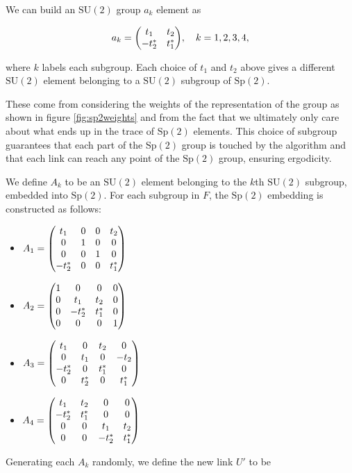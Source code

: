 \documentclass[reqno,12pt]{article}
\numberwithin{equation}{section}
\newcommand{\SU}{\mathrm{SU}}
\newcommand{\Sp}{\mathrm{Sp}}
\begin{document}
We can build an $\SU(2)$ group $a_k$ element as

\begin{equation} \label{eq:su2element}
	a_k = \mqty(t_1 & t_2 \\ -t_2^* & t_1^*) \qc k = 1, 2, 3, 4,
\end{equation}

where $k$ labels each subgroup. 
Each choice of $t_1$ and $t_2$ above gives a different $\SU(2)$ element belonging to a $\SU(2)$ subgroup of $\Sp(2)$.

These come from considering the weights of the representation of the group as shown in figure \ref{fig:sp2weights} and from
the fact that we ultimately only care about what ends up in the trace of $\Sp(2)$ elements. This choice of subgroup
guarantees that each part of the $\Sp(2)$ group is touched by the algorithm and that each link can reach any point
of the $\Sp(2)$ group, ensuring ergodicity.

We define $A_k$ to be an $\SU(2)$ element belonging to the $k$th $\SU(2)$ subgroup, embedded into $\Sp(2)$. 
For each subgroup in $F$, the $\Sp(2)$ embedding is constructed as follows:

\begin{itemize}
	\item $A_1 = \mqty(
		t_1 & 0 & 0 & t_2 \\
		0 & 1 & 0 & 0 \\
		0 & 0 & 1 & 0 \\
		-t^*_2 & 0 & 0 & t^*_1 
		)$
	\item $A_2 = \mqty(
		1 & 0 & 0 & 0 \\
		0 & t_1 & t_2 & 0 \\
		0 & -t^*_2 & t^*_1 & 0 \\
		0 & 0 & 0 & 1 
		)$
	\item $A_3 = \mqty(
		t_1 & 0 & t_2 & 0 \\
		0 & t_1 & 0 & -t_2 \\
		-t_2^* & 0 & t^*_1 & 0 \\
		0 & t^*_2 & 0 & t^*_1 
		)$
	\item $A_4 = \mqty(
		t_1 & t_2 & 0 & 0 \\
		-t^*_2 & t^*_1 & 0 & 0 \\
		0 & 0 & t_1 & t_2  \\
		0 & 0 & -t^*_2 & t^*_1 
		)$
\end{itemize}

Generating each $A_k$ randomly, we define the new link $U'$ to be
\end{document}
